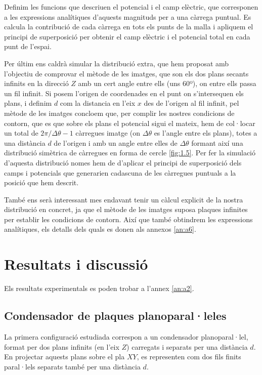 \documentclass[a4paper,10.5pt]{report}
\begin{document}
Definim les funcions que descriuen el potencial i el camp elèctric, que corresponen a les expressions analítiques d'aquests magnituds per a una càrrega puntual. Es calcula la contribució de cada càrrega en tots els punts de la malla i  apliquem el principi de superposició per obtenir el camp elèctric i el potencial total en cada punt de l’espai.

Per últim ens caldrà simular la distribució extra, que hem proposat amb l'objectiu de comprovar el mètode de les imatges, que son els dos plans secants infinits en la direcció $Z$ amb un cert angle entre ells (uns 60º), on entre ells passa un fil infinit. Si posem l'origen de coordenades en el punt on s'intersequen els plans, i definim $d$ com la distancia en l'eix $x$ des de l'origen al fil infinit, pel mètode de les imatges concloem que, per complir les nostres condicions de contorn, que es que sobre els plans el potencial sigui el mateix, hem de col·locar un total de $2\pi/\Delta\theta-1$ càrregues imatge (on $\Delta\theta$ es l'angle entre els plans), totes a una distància $d$ de l'origen i amb un angle entre elles de $\Delta\theta$ formant així una distribució simètrica de càrregues en forma de cercle \ref{fig:1.5}. 
Per fer la simulació d'aquesta distribució nomes hem de d'aplicar el principi de superposició dels camps i potencials que generarien cadascuna de les càrregues puntuals a la posició que hem descrit.

També ens serà interessant mes endavant tenir un càlcul explicit de la nostra distribució en concret, ja que el mètode de les imatges suposa plaques infinites per establir les condicions de contorn. Així que també obtindrem les expressions analítiques, els detalls dels quals es donen als annexos \ref{an:a6}. 
\section{Resultats i discussió}
Els resultats experimentals es poden trobar a l'annex \ref{an:a2}.

\subsection{Condensador de plaques planoparal·leles}
La primera configuració estudiada correspon a un condensador planoparal·lel, format per dos plans infinits (en l'eix $Z$) carregats i separats per una distància $d$. En projectar aquests plans sobre el pla $XY$, es representen com dos fils finits paral·lels separats també per una distància $d$. 
\end{document}
